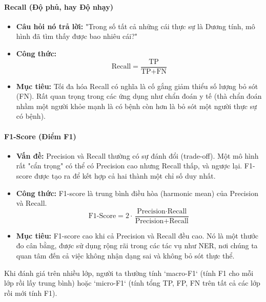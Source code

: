 \paragraph{Recall (Độ phủ, hay Độ nhạy)}
\begin{itemize}
    \item \textbf{Câu hỏi nó trả lời:} "Trong số tất cả những cái thực sự là Dương tính, mô hình đã tìm thấy được bao nhiêu cái?"
    \item \textbf{Công thức:}
        $$ \text{Recall} = \frac{\text{TP}}{\text{TP} + \text{FN}} $$
    \item \textbf{Mục tiêu:} Tối đa hóa Recall có nghĩa là cố gắng giảm thiểu số lượng bỏ sót (FN). Rất quan trọng trong các ứng dụng như chẩn đoán y tế (thà chẩn đoán nhầm một người khỏe mạnh là có bệnh còn hơn là bỏ sót một người thực sự có bệnh).
\end{itemize}

\paragraph{F1-Score (Điểm F1)}
\begin{itemize}
    \item \textbf{Vấn đề:} Precision và Recall thường có sự đánh đổi (trade-off). Một mô hình rất "cẩn trọng" có thể có Precision cao nhưng Recall thấp, và ngược lại. F1-score được tạo ra để kết hợp cả hai thành một chỉ số duy nhất.
    \item \textbf{Công thức:} F1-score là trung bình điều hòa (harmonic mean) của Precision và Recall.
        $$ \text{F1-Score} = 2 \cdot \frac{\text{Precision} \cdot \text{Recall}}{\text{Precision} + \text{Recall}} $$
    \item \textbf{Mục tiêu:} F1-score cao khi cả Precision và Recall đều cao. Nó là một thước đo cân bằng, được sử dụng rộng rãi trong các tác vụ như NER, nơi chúng ta quan tâm đến cả việc không nhận dạng sai và không bỏ sót thực thể.
\end{itemize}
Khi đánh giá trên nhiều lớp, người ta thường tính `macro-F1` (tính F1 cho mỗi lớp rồi lấy trung bình) hoặc `micro-F1` (tính tổng TP, FP, FN trên tất cả các lớp rồi mới tính F1).

